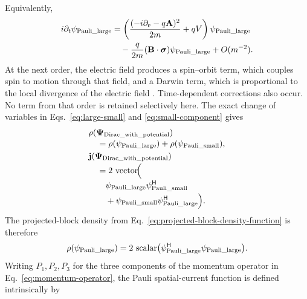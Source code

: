 \documentclass[10pt,letterpaper]{article}
\let\STAamsmathtext\text
\newcommand{\eqtext}[1]{\STAamsmathtext{\normalfont\rmfamily #1}}
\newcommand{\eqfunc}[1]{\operatorname{#1}}
\renewcommand{\text}[1]{\STAamsmathtext{\normalfont\rmfamily #1}}
\newcommand{\pv}[1]{#1}
\newcommand{\vct}[1]{\mathbf{#1}}
\newcommand{\sigv}{\vct{\pv{\bm{\sigma}}}}
\newcommand{\bPsi}{\pv{\bm{\Psi}}}
\newcommand{\delop}{\partial}
\newcommand{\delr}{\delop_{\vct{r}}}
\newcommand{\gradv}{\delr}
\newcommand{\Hop}{\mathsf H}
\newcommand{\herm}[1]{#1^{\Hop}}
\begin{document}
Equivalently,
\begin{equation}
\begin{aligned}
i\partial_t\pv{\psi}_{\eqtext{Pauli\_large}}
&=\left(\frac{(-i\gradv-q\vct{A})^2}{2m}+qV\right)
\pv{\psi}_{\eqtext{Pauli\_large}}\\
&\quad-\frac{q}{2m}(\vct{B}\cdot\sigv)
\pv{\psi}_{\eqtext{Pauli\_large}}+O(m^{-2}).
\end{aligned}
\label{eq:pauli}
\end{equation}
At the next order, the electric field produces a spin--orbit term, which
couples spin to motion through that field, and a Darwin term, which is
proportional to the local divergence of the electric field
\cite{sakurai2017}. Time-dependent corrections also occur. No term from that
order is retained selectively here.
The exact change of variables in Eqs.\ \eqref{eq:large-small} and
\eqref{eq:small-component} gives
\begin{equation}
\begin{aligned}
&\rho(\bPsi_{\eqtext{Dirac\_with\_potential}})\\[-0.2em]
&\quad=\rho(\pv{\psi}_{\eqtext{Pauli\_large}})
+\rho(\pv{\psi}_{\eqtext{Pauli\_small}}),\\
&\vct{j}(\bPsi_{\eqtext{Dirac\_with\_potential}})\\[-0.2em]
&\quad=2\,\eqfunc{vector}\!\Bigl(\\[-0.2em]
&\qquad
\pv{\psi}_{\eqtext{Pauli\_large}}
\herm{\pv{\psi}_{\eqtext{Pauli\_small}}}\\[-0.1em]
&\qquad
+\pv{\psi}_{\eqtext{Pauli\_small}}
\herm{\pv{\psi}_{\eqtext{Pauli\_large}}}
\Bigr).
\end{aligned}
\label{eq:large-small-current-change}
\end{equation}
The projected-block density from
Eq.\ \eqref{eq:projected-block-density-function} is therefore
\begin{equation}
\rho(\pv{\psi}_{\eqtext{Pauli\_large}})
=2\,\eqfunc{scalar}\bigl(
 \herm{\pv{\psi}_{\eqtext{Pauli\_large}}}
 \pv{\psi}_{\eqtext{Pauli\_large}}\bigr).
\label{eq:pauli-density}
\end{equation}
Writing \(P_1,P_2,P_3\) for the three components of the momentum operator in
Eq.\ \eqref{eq:momentum-operator}, the Pauli spatial-current function is
defined intrinsically by
\end{document}
